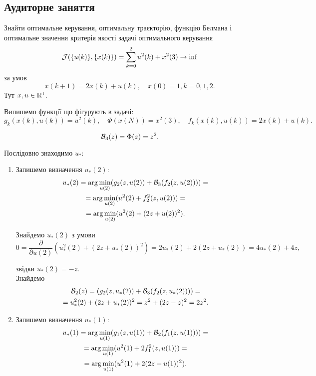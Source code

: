 \subsection{Аудиторне заняття}

\begin{problem}
	Знайти оптимальне керування, оптимальну траєкторію, функцію Белмана і оптимальне значення критерія якості задачі оптимального керування \[ \mathcal{J}(\{u(k)\},\{x(k)\}) = \sum_{k=0}^2 u^2(k) + x^2(3) \to \inf \] за умов \[ x(k + 1) = 2 x(k) + u(k), \quad x(0) = 1, k = 0,1,2.\] Тут $x,u\in\mathbb{R}^1$.
\end{problem}

\begin{solution}
	Випишемо функції що фігурують в задачі: \[ g_k (x (k), u (k)) = u^2 (k), \quad \Phi (x (N)) = x^2 (3), \quad f_k (x (k), u (k)) = 2 x (k) + u (k). \]

	\[\mathcal{B}_3 (z) = \Phi (z) = z^2. \]

	Послідовно знаходимо $u_*$:
	\begin{enumerate}

	\item Запишемо визначення $u_*(2)$:
	\begin{multline*} 
		u_*(2) = \arg\min_{u(2)} (g_2(z, u(2)) + \mathcal{B}_3(f_2(z,u(2)))) = \\
		= \arg\min_{u(2)} (u^2(2) + f_2^2(z, u(2))) = \\
		= \arg\min_{u(2)} (u^2(2) + (2 z + u(2))^2).
	\end{multline*}

	Знайдемо $u_*(2)$ з умови 
	\[ 0 = \frac{\partial}{\partial u(2)} \left(u_*^2(2) + (2 z + u_*(2))^2 \right) = 2 u_*(2) + 2 (2 z + u_*(2)) = 4 u_*(2) + 4 z,\]

	звідки $u_*(2) = - z$. \\

	Знайдемо
	\begin{multline*}
		\mathcal{B}_2 (z) = (g_2(z, u_*(2)) + \mathcal{B}_3(f_2(z,u_*(2)))) = \\
		= u_*^2(2) + (2 z + u_*(2))^2 = z^2 + (2 z - z)^2 = 2 z^2.
	\end{multline*}

	\item Запишемо визначення $u_*(1)$:
	\begin{multline*} 
		u_*(1) = \arg\min_{u(1)} (g_1(z, u(1)) + \mathcal{B}_2(f_1(z,u(1)))) = \\
		= \arg\min_{u(1)} (u^2(1) + 2 f_1^2(z, u(1))) = \\
		= \arg\min_{u(1)} (u^2(1) + 2 (2 z + u(1))^2).
	\end{multline*}


\end{enumerate}
\end{solution}
